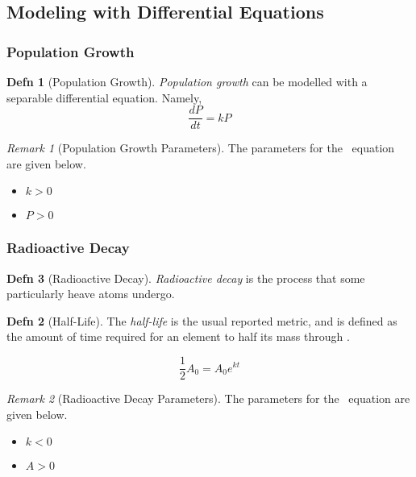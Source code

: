 \documentclass[10pt,letterpaper,final,twoside,notitlepage]{article}
\theoremstyle{plain}
\theoremstyle{definition}
\newtheorem{definition}{Defn}
\theoremstyle{remark}
\newtheorem{remark}{Remark}[definition]
\begin{document}
	\subsection{Modeling with Differential Equations} \label{subsec:Modeling with DEs}
		\subsubsection{Population Growth} \label{subsubsec:Population Growth}
			\begin{definition}[Population Growth]
				\emph{Population growth} can be modelled with a separable differential equation. Namely,
				\begin{equation} \label{eq:Population Growth}
					\frac{dP}{dt} = kP
				\end{equation}
				\begin{remark}[Population Growth Parameters] \label{rmk:Population Growth Parameters}
					The parameters for the ~equation are given below.
					\begin{itemize}[noitemsep, nolistsep]
						\item $k>0$
						\item $P>0$
					\end{itemize}
				\end{remark}
			\end{definition}
		\subsubsection{Radioactive Decay} \label{subsubsec:Radioactive Decay}
			\begin{definition}[Radioactive Decay] \label{def:Radioactive Decay}
				\emph{Radioactive decay} is the process that some particularly heave atoms undergo.
				\begin{definition}[Half-Life] \label{subdef:Half-Life}
					The \emph{half-life} is the usual reported metric, and is defined as the amount of time required for an element to half its mass through .
				\end{definition}
				\begin{equation} \label{eq:Radioactive Decay}
					\frac{1}{2} A_{0} = A_{0} e^{kt}
				\end{equation}
				\begin{remark}[Radioactive Decay Parameters] \label{rmk:Radioactive Decay Parameters}
					The parameters for the ~equation are given below.
					\begin{itemize}[noitemsep, nolistsep]
						\item $k<0$
						\item $A>0$
					\end{itemize}
				\end{remark}
			\end{definition}
\end{document}

